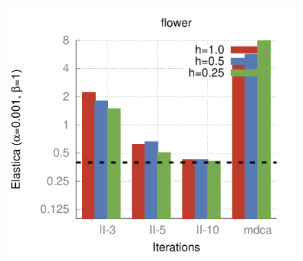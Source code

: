 \begin{figure}[]
{\includegraphics[scale=0.4]{figures/chapter5/flow/plots/bars/length_pen_0.00100/flower.pdf}
}\hspace{1em}%
\hspace{1em}%
\subfloat{
}
\end{figure}
